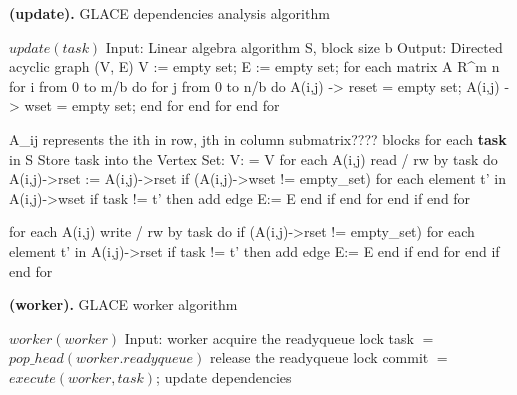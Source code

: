 \documentclass[preprint,11pt]{elsarticle}
\begin{document}
\begin{algorithm}
\caption{{\bf (update).} GLACE dependencies analysis algorithm}
\label{alg:update}
{\footnotesize
\begin{algorithmic} [1]
\STATE $update(task)$
\STATE Input: Linear algebra algorithm S, block size b
\STATE Output: Directed acyclic graph (V, E)
\STATE V :=  empty set; E := empty set;
for each matrix A \in R^{m \times n}
  for i from 0 to m/b do
    for j from 0 to n/b do
	  A(i,j) -> reset = empty set; A(i,j) -> wset = empty set;
	end for
  end for
end for

A_ij   represents the ith in row, jth in column submatrix???? blocks
for each \textbf{task} in S
Store task into the Vertex Set: V: = V 
for each A(i,j) read / rw by task do
A(i,j)->rset :=  A(i,j)->rset 
if (A(i,j)->wset != empty_set) 
  for each element t' in A(i,j)->wset 
  	if task != t' then 
		add edge E:= E 
	end if
  end for
end if
end for


for each A(i,j) write / rw by task do
if (A(i,j)->rset != empty_set)
  for each element t' in A(i,j)->rset
    if task != t' then
		add edge E:= E 
	end if
  end for
end if
end for




\end{algorithmic}
}
\end{algorithm}






\begin{algorithm}
\caption{{\bf (worker).} GLACE worker algorithm}
\label{alg:worker}
{\footnotesize
\begin{algorithmic} [1]
\STATE $worker(worker)$
\STATE Input: worker
  \STATE acquire the readyqueue lock
  \STATE task $=$ $pop\_head(worker.readyqueue)$
  \STATE release the readyqueue lock
    \STATE commit $=$ $execute(worker, task)$;
      \STATE update dependencies
    \ENDIF
  \ENDIF
\ENDWHILE
\end{algorithmic}
}
\end{algorithm}

\end{document}
